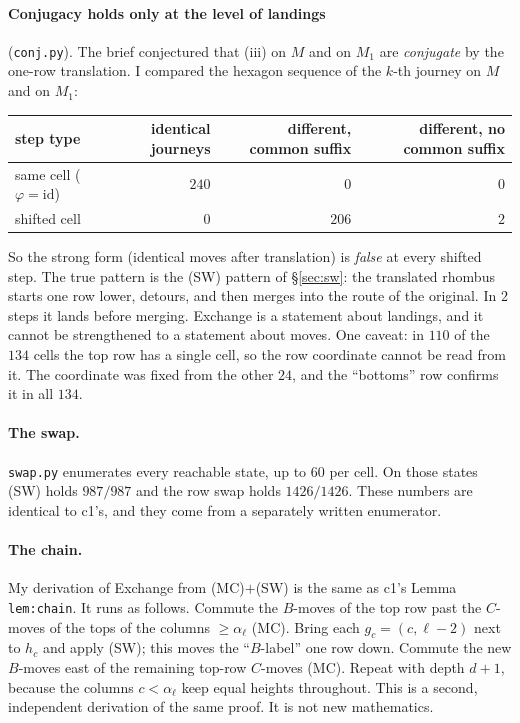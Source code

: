 \documentclass[11pt]{article}
\theoremstyle{definition}
\begin{document}
\paragraph{Conjugacy holds only at the level of landings} (\texttt{conj.py}). The brief conjectured that (iii) on $M$ and on $M_1$ are
\emph{conjugate} by the one-row translation. I compared the hexagon sequence of the $k$-th journey on $M$ and on $M_1$:
\begin{center}\begin{tabular}{lrrr}\toprule
step type & identical journeys & different, common suffix & different, no common suffix\\\midrule
same cell ($\varphi=\mathrm{id}$) & $240$ & $0$ & $0$\\
shifted cell & $0$ & $206$ & $2$\\\bottomrule
\end{tabular}\end{center}
So the strong form (identical moves after translation) is \emph{false} at every shifted step. The true pattern is the (SW) pattern of
\S\ref{sec:sw}: the translated rhombus starts one row lower, detours, and then merges into the route of the original. In $2$ steps it lands before merging.
Exchange is a statement about landings, and it cannot be strengthened to a statement about moves.
One caveat: in $110$ of the $134$ cells the top row has a single cell, so the row coordinate cannot be read from it. The coordinate
was fixed from the other $24$, and the ``bottoms'' row confirms it in all $134$.

\paragraph{The swap.} \texttt{swap.py} enumerates every reachable state, up to $60$ per cell. On those states (SW) holds $987/987$
and the row swap holds $1426/1426$. These numbers are identical to c1's, and they come from a separately written enumerator.

\paragraph{The chain.} My derivation of Exchange from (MC)$+$(SW) is the same as c1's Lemma \texttt{lem:chain}. It runs as follows.
Commute the $B$-moves of the top row past the $C$-moves of the tops of the columns $\ge\alpha_\ell$ (MC). Bring each
$g_c=(c,\ell-2)$ next to $h_c$ and apply (SW); this moves the ``$B$-label'' one row down. Commute the new $B$-moves east of the
remaining top-row $C$-moves (MC). Repeat with depth $d+1$, because the columns $c<\alpha_\ell$ keep equal heights throughout.
This is a second, independent derivation of the same proof. It is not new mathematics.
\end{document}
